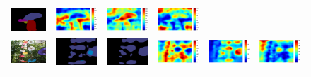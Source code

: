 \documentclass[10pt,twocolumn,letterpaper]{article}
\begin{document}
\begin{figure}[!h]
{\begin{tabular}{c c c c c c}
   \includegraphics[height=0.095\linewidth]{fig/coco/res_sharenet/COCO_val2014_000000010693.png} &
   \includegraphics[height=0.095\linewidth]{fig/coco/att1/COCO_val2014_000000010693.pdf} &
   \includegraphics[height=0.095\linewidth]{fig/coco/att2/COCO_val2014_000000010693.pdf} &
   \includegraphics[height=0.095\linewidth]{fig/coco/att3/COCO_val2014_000000010693.pdf} \\
   \includegraphics[height=0.095\linewidth]{fig/coco/img/COCO_val2014_000000001840.jpg} &
   \includegraphics[height=0.095\linewidth]{fig/coco/res_baseline/COCO_val2014_000000001840.png} &
   \includegraphics[height=0.095\linewidth]{fig/coco/res_sharenet/COCO_val2014_000000001840.png} &
   \includegraphics[height=0.095\linewidth]{fig/coco/att1/COCO_val2014_000000001840.pdf} &
   \includegraphics[height=0.095\linewidth]{fig/coco/att2/COCO_val2014_000000001840.pdf} &
   \includegraphics[height=0.095\linewidth]{fig/coco/att3/COCO_val2014_000000001840.pdf} \\

\end{tabular}}
\end{figure}
\end{document}
